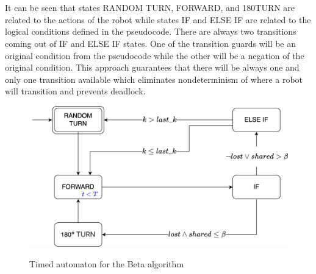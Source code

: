 \\\\
It can be seen that states RANDOM TURN, FORWARD, and 180\degree TURN are related to the actions of the robot while states IF and ELSE IF are related to the logical conditions defined in the pseudocode. There are always two transitions coming out of IF and ELSE IF states. One of the transition guards will be an original condition from the pseudocode while the other will be a negation of the original condition. This approach guarantees that there will be always one and only one transition available which eliminates nondeterminism of where a robot will transition and prevents deadlock.


\begin{figure}[H]
\caption{Timed automaton for the Beta algorithm}
\includegraphics[width=\textwidth]{images/beta.png}
\label{fig:automaton}
\end{figure}
